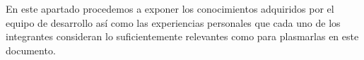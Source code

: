 En este apartado procedemos a exponer los conocimientos adquiridos por el equipo de desarrollo así como las experiencias personales que cada uno de los integrantes consideran lo suficientemente relevantes como para plasmarlas en este documento.